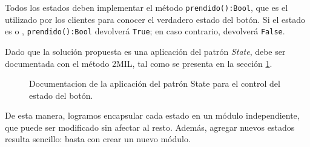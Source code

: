 Todos los estados deben implementar el método \verb|prendido():Bool|, que es el utilizado por los clientes para conocer el verdadero estado del botón. Si el estado es \On o \WaitOff, \verb|prendido():Bool| devolverá \verb|True|; en caso contrario, devolverá \verb|False|.

Dado que la solución propuesta es una aplicación del patrón \textit{State}, debe ser documentada con el método 2MIL, tal como se presenta en la sección \ref{docDeboun}.

\begin{figure}
\caption{Documentacion de la aplicación del patrón State para el control del estado del botón.}
\label{docDeboun}
\end{figure}


De esta manera, logramos encapsular cada estado en un módulo independiente, que puede ser modificado sin afectar al resto. Además, agregar nuevos estados resulta sencillo: basta con crear un nuevo módulo.



